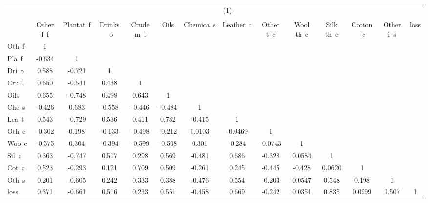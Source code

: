 \begin{tabular}{l*{13}{c}}
\hline\hline
    &\multicolumn{13}{c}{(1)}                                                                                                         \\
    &\multicolumn{13}{c}{}                                                                                                            \\
    &Other f~f&Plantat~f&Drinks ~o&Crude m~l&     Oils&Chemica~s&Leather~t&Other t~c&Wool th~c&Silk th~c&Cotton ~c&Other i~s&     loss\\
\hline
Oth~f&        1&         &         &         &         &         &         &         &         &         &         &         &         \\
Pla~f&   -0.634&        1&         &         &         &         &         &         &         &         &         &         &         \\
Dri~o&    0.588&   -0.721&        1&         &         &         &         &         &         &         &         &         &         \\
Cru~l&    0.650&   -0.541&    0.438&        1&         &         &         &         &         &         &         &         &         \\
Oils&    0.655&   -0.748&    0.498&    0.643&        1&         &         &         &         &         &         &         &         \\
Che~s&   -0.426&    0.683&   -0.558&   -0.446&   -0.484&        1&         &         &         &         &         &         &         \\
Lea~t&    0.543&   -0.729&    0.536&    0.411&    0.782&   -0.415&        1&         &         &         &         &         &         \\
Oth~c&   -0.302&    0.198&   -0.133&   -0.498&   -0.212&   0.0103&  -0.0469&        1&         &         &         &         &         \\
Woo~c&   -0.575&    0.304&   -0.394&   -0.599&   -0.508&    0.301&   -0.284&  -0.0743&        1&         &         &         &         \\
Sil~c&    0.363&   -0.747&    0.517&    0.298&    0.569&   -0.481&    0.686&   -0.328&   0.0584&        1&         &         &         \\
Cot~c&    0.523&   -0.293&    0.121&    0.709&    0.509&   -0.261&    0.245&   -0.445&   -0.428&   0.0620&        1&         &         \\
Oth~s&    0.201&   -0.605&    0.242&    0.333&    0.388&   -0.476&    0.554&   -0.203&   0.0547&    0.548&    0.198&        1&         \\
loss&    0.371&   -0.661&    0.516&    0.233&    0.551&   -0.458&    0.669&   -0.242&   0.0351&    0.835&   0.0999&    0.507&        1\\
\hline\hline
\end{tabular}
